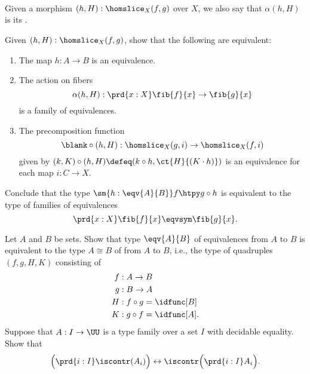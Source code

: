 \begin{exercises}
\begin{subexenum}
\begin{equation*}
\begin{tikzcd}[column sep=-3em]
      \end{tikzcd}
    \end{equation*}
    Given a morphism $(h,H):\homslice_X(f,g)$ over $X$, we also say that $\alpha(h,H)$ is its .
  \item \label{ex:fam-equiv}Given $(h,H):\homslice_X(f,g)$, show that the following are equivalent:
    \begin{enumerate}
    \item The map $h:A\to B$ is an equivalence.
    \item The action on fibers
      \begin{equation*}
        \alpha(h,H):\prd{x:X}\fib{f}{x}\to\fib{g}{x}
      \end{equation*}
      is a family of equivalences.
    \item The precomposition function
      \begin{equation*}
        \blank\circ (h,H) : \homslice_X(g,i)\to\homslice_X(f,i)
      \end{equation*}
      given by $(k,K)\circ (h,H) \defeq (k\circ h,\ct{H}{(K\cdot h)})$ is an equivalence for each map $i:C\to X$.
    \end{enumerate}
    Conclude that the type $\sm{h:\eqv{A}{B}} f\htpy g\circ h$ is equivalent to the type of families of equivalences
    \begin{equation*}
      \prd{x:X}\fib{f}{x}\eqvsym\fib{g}{x}.
    \end{equation*} 
  \end{subexenum}
\exitem \label{ex:iso_equiv}Let $A$ and $B$ be sets. Show that type $\eqv{A}{B}$ of equivalences from $A$ to $B$ is equivalent to the type $A\cong B$ of  from $A$ to $B$, i.e., the type of quadruples $(f,g,H,K)$ consisting of
  \begin{align*}
    f & : A\to B \\
    g & : B\to A \\
    H & : f\circ g = \idfunc[B] \\
    K & : g\circ f = \idfunc[A].
  \end{align*}
\exitem Suppose that $A:I\to \UU$ is a type family over a set $I$ with decidable equality. Show that
  \begin{equation*}
    \Big(\prd{i:I}\iscontr(A_i)\Big)\leftrightarrow \iscontr\Big(\prd{i:I}A_i\Big).

\end{equation*}
\end{exercises}
